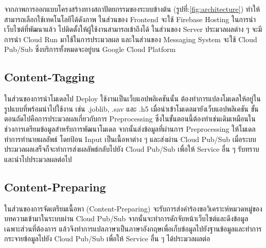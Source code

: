 \documentclass[12pt,oneside,openright,a4paper]{cpe-thai-project}
\begin{document}
  \hspace{1cm}จากภาพการออกแบบโครงสร้างทางสถาปัตยกรรมของระบบข้างต้น (รูปที่:\ref{fig:architecture}) ทำให้สามารถเลือกใช้เทคโนโลยีได้ดังภาพ ในส่วนของ Frontend จะใช้ Firebase Hosting 
  ในการนำเว็บไซต์ที่พัฒนาแล้ว ไปติดตั้งให้ผู้ใช้งานสามารถเข้าถึงได้ ในส่วนของ Server ประมวลผลต่าง ๆ จะมีการนำ Cloud Run มาใช้ในการประมวลผล 
  และในส่วนของ Messaging System จะใช้ Cloud Pub/Sub ซึ่งบริการทั้งหมดจะอยู่บน Google Cloud Platform 

\subsection{Content-Tagging}
  \hspace{1cm}ในส่วนของการนำโมเดลไป Deploy ใช้งานเป็นเว็บแอปพลิเคชันนั้น ต้องทำการแปลงโมเดลให้อยู่ในรูปแบบที่พร้อมนำไปใช้งาน 
  เช่น .joblib, .sav และ .h5 เมื่อนำเข้าโมเดลมายังเว็บแอปพลิเคชัน ขั้นตอนถัดไปคือการประมวลผลเกี่ยวกับการ Preprocessing 
  ซึ่งในขั้นตอนนี้ต้องทำเช่นเดิมเหมือนในช่วงการเตรียมข้อมูลสำหรับการพัฒนาโมเดล จากนั้นส่งข้อมูลที่ผ่านการ Preprocessing ให้โมเดลทำการทำนายผลลัพธ์ 
  โดยป้อน Input เป็นเนื้อหาต่าง ๆ และส่งผ่าน Cloud Pub/Sub เมื่อระบบประมวลผลเสร็จก็จะทำการส่งผลลัพธ์กลับไปยัง Cloud Pub/Sub 
  เพื่อให้ Service อื่น ๆ รับทราบและนำไปประมวลผลต่อไป

\subsection{Content-Preparing}
  \hspace{1cm}ในส่วนของการจัดเตรียมเนื้อหา (Content-Preparing) จะรับการส่งคำร้องขอวิเคราะห์หมวดหมู่ของบทความเข้ามาในระบบผ่าน Cloud Pub/Sub 
  จากนั้นจะทำการดักจับหน้าเว็บไซต์และดึงข้อมูลเฉพาะส่วนที่ต้องการ แล้วจึงทำการแปลภาษาเป็นภาษาอังกฤษเพื่อเก็บข้อมูลไปยังฐานข้อมูลและทำการกระจายข้อมูลไปยัง 
  Cloud Pub/Sub เพื่อให้ Service อื่น ๆ ได้ประมวลผลต่อ
\newpage
\end{document}
